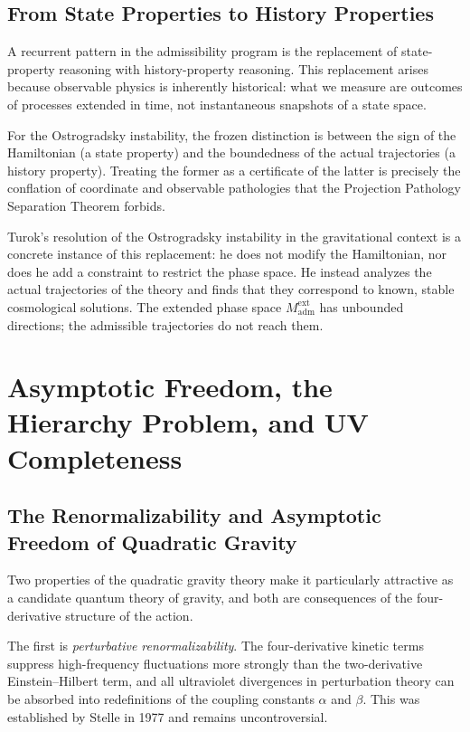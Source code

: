 \documentclass[12pt,a4paper]{article}
\theoremstyle{remark}
\begin{document}
\subsection{From State Properties to History Properties}

A recurrent pattern in the admissibility program is the replacement of
state-property reasoning with history-property reasoning. This replacement
arises because observable physics is inherently historical: what we measure
are outcomes of processes extended in time, not instantaneous snapshots
of a state space.

For the Ostrogradsky instability, the frozen distinction is between the sign
of the Hamiltonian (a state property) and the boundedness of the actual
trajectories (a history property). Treating the former as a certificate of
the latter is precisely the conflation of coordinate and observable pathologies
that the Projection Pathology Separation Theorem forbids.

Turok's resolution of the Ostrogradsky instability in the gravitational
context is a concrete instance of this replacement: he does not modify the
Hamiltonian, nor does he add a constraint to restrict the phase space. He
instead analyzes the actual trajectories of the theory and finds that they
correspond to known, stable cosmological solutions. The extended phase space
$M_{\mathrm{adm}}^{\mathrm{ext}}$ has unbounded directions; the admissible
trajectories do not reach them.


\section{Asymptotic Freedom, the Hierarchy Problem, and UV Completeness}

\subsection{The Renormalizability and Asymptotic Freedom of Quadratic Gravity}

Two properties of the quadratic gravity theory make it particularly attractive
as a candidate quantum theory of gravity, and both are consequences of
the four-derivative structure of the action.

The first is \emph{perturbative renormalizability}. The four-derivative
kinetic terms suppress high-frequency fluctuations more strongly than the
two-derivative Einstein--Hilbert term, and all ultraviolet divergences in
perturbation theory can be absorbed into redefinitions of the coupling
constants $\alpha$ and $\beta$. This was established by Stelle in 1977 and
remains uncontroversial.
\end{document}
